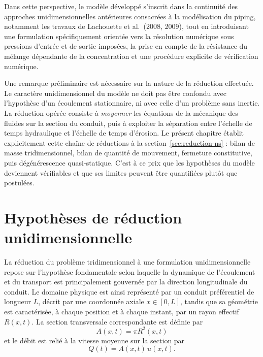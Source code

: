 \documentclass[11pt,a4paper]{report}
\begin{document}
Dans cette perspective, le modèle développé s'inscrit dans la continuité des approches
unidimensionnelles antérieures consacrées à la modélisation du piping, notamment les travaux de
Lachouette et al.\ (2008, 2009), tout en introduisant une formulation spécifiquement orientée vers la
résolution numérique sous pressions d'entrée et de sortie imposées, la prise en compte de la résistance
du mélange dépendante de la concentration et une procédure explicite de vérification numérique.

Une remarque préliminaire est nécessaire sur la nature de la réduction effectuée. Le caractère
\og unidimensionnel \fg{} du modèle ne doit pas être confondu avec l'hypothèse d'un écoulement
stationnaire, ni avec celle d'un problème sans inertie. La réduction opérée consiste à \emph{moyenner}
les équations de la mécanique des fluides sur la section du conduit, puis à exploiter la séparation
entre l'échelle de temps hydraulique et l'échelle de temps d'érosion. Le présent chapitre établit
explicitement cette chaîne de réductions à la section~\ref{sec:reduction-ns} : bilan de masse
tridimensionnel, bilan de quantité de mouvement, fermeture constitutive, puis dégénérescence
quasi-statique. C'est à ce prix que les hypothèses du modèle deviennent vérifiables et que ses limites
peuvent être quantifiées plutôt que postulées.

\section{Hypothèses de réduction unidimensionnelle}
\label{sec:hypotheses}

La réduction du problème tridimensionnel à une formulation unidimensionnelle repose sur l'hypothèse
fondamentale selon laquelle la dynamique de l'écoulement et du transport est principalement gouvernée
par la direction longitudinale du conduit. Le domaine physique est ainsi représenté par un conduit
préférentiel de longueur \(L\), décrit par une coordonnée axiale \(x \in [0, L]\), tandis que sa
géométrie est caractérisée, à chaque position et à chaque instant, par un rayon effectif \(R(x,t)\). La
section transversale correspondante est définie par
\[
A(x,t) = \pi R^2(x,t)
\]
et le débit est relié à la vitesse moyenne sur la section par
\[
Q(t) = A(x,t)\,u(x,t).
\]
\end{document}
